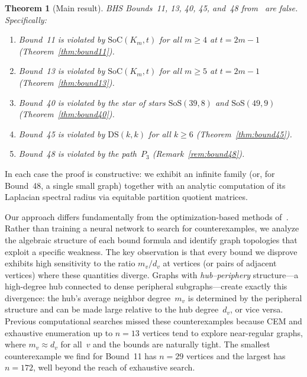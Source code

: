 \documentclass[preprint,12pt]{elsarticle}
\newtheorem{theorem}{Theorem}[section]
\theoremstyle{definition}
\theoremstyle{remark}
\newcommand{\SoC}{\mathrm{SoC}}       %
\newcommand{\SoS}{\mathrm{SoS}}       %
\newcommand{\DS}{\mathrm{DS}}          %
\begin{document}
\begin{theorem}[Main result]\label{thm:main}
  BHS Bounds~11, 13, 40, 45, and~48 from~\cite{BHS2006} are false.
  Specifically:
  \begin{enumerate}[label=\textup{(\alph*)}]
    \item Bound~11 is violated by $\SoC(K_m, t)$ for all $m \geq 4$
      at $t = 2m - 1$
      \textup{(Theorem~\ref{thm:bound11})}.
    \item Bound~13 is violated by $\SoC(K_m, t)$ for all $m \geq 5$
      at $t = 2m - 1$
      \textup{(Theorem~\ref{thm:bound13})}.
    \item Bound~40 is violated by the star of stars
      $\SoS(39, 8)$ and $\SoS(49, 9)$
      \textup{(Theorem~\ref{thm:bound40})}.
    \item Bound~45 is violated by $\DS(k,k)$ for all $k \geq 6$
      \textup{(Theorem~\ref{thm:bound45})}.
    \item Bound~48 is violated by the path~$P_3$
      \textup{(Remark~\ref{rem:bound48})}.
  \end{enumerate}
\end{theorem}

\noindent
In each case the proof is constructive: we exhibit an infinite family
(or, for Bound~48, a single small graph) together with an analytic
computation of its Laplacian spectral radius via equitable partition
quotient matrices.

Our approach differs fundamentally from the optimization-based methods
of~\cite{Ghebleh2024,Wagner2021,BouffardBreen2025}. Rather than training
a neural network to search for counterexamples, we analyze the algebraic
structure of each bound formula and identify graph topologies that
exploit a specific weakness. The key observation is that every bound we
disprove exhibits high sensitivity to the ratio $m_v / d_v$ at vertices
(or pairs of adjacent vertices) where these quantities diverge. Graphs
with \emph{hub--periphery} structure---a high-degree hub connected to
dense peripheral subgraphs---create exactly this divergence: the hub's
average neighbor degree~$m_v$ is determined by the peripheral structure
and can be made large relative to the hub degree~$d_v$, or vice versa.
Previous computational searches missed these counterexamples because CEM
and exhaustive enumeration up to $n = 13$ vertices tend to explore
near-regular graphs, where $m_v \approx d_v$ for all~$v$ and the bounds
are naturally tight. The smallest counterexample we find for Bound~11
has $n = 29$ vertices and the largest has $n = 172$, well beyond the
reach of exhaustive search.
\end{document}
